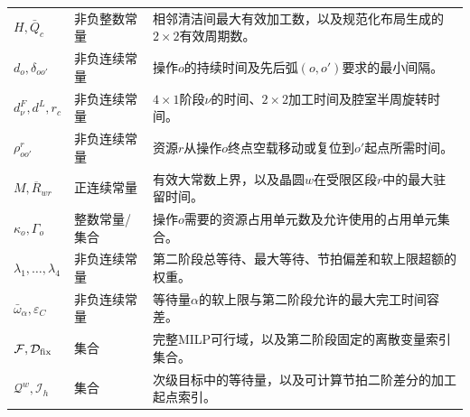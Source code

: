 \documentclass[journal]{IEEEtran}
\begin{document}
\begin{table}[t]
\begin{tabular}{C{0.20\textwidth}C{0.20\textwidth}C{0.55\textwidth}}
$H,\bar Q_c$ & 非负整数常量 & 相邻清洁间最大有效加工数，以及规范化布局生成的$2\times2$有效周期数。\\
$d_o,\delta_{oo'}$ & 非负连续常量 & 操作$o$的持续时间及先后弧$(o,o')$要求的最小间隔。\\
$d^F_\nu,d^L,r_c$ & 非负连续常量 & $4\times1$阶段$\nu$的时间、$2\times2$加工时间及腔室半周旋转时间。\\
$\rho^r_{oo'}$ & 非负连续常量 & 资源$r$从操作$o$终点空载移动或复位到$o'$起点所需时间。\\
$M,\overline R_{wr}$ & 正连续常量 & 有效大常数上界，以及晶圆$w$在受限区段$r$中的最大驻留时间。\\
$\kappa_o,\Gamma_o$ & 整数常量/集合 & 操作$o$需要的资源占用单元数及允许使用的占用单元集合。\\
$\lambda_1,\ldots,\lambda_4$ & 非负连续常量 & 第二阶段总等待、最大等待、节拍偏差和软上限超额的权重。\\
$\bar\omega_\alpha,\varepsilon_C$ & 非负连续常量 & 等待量$\alpha$的软上限与第二阶段允许的最大完工时间容差。\\
$\mathcal F,\mathcal D_{\rm fix}$ & 集合 & 完整MILP可行域，以及第二阶段固定的离散变量索引集合。\\
$\mathcal Q^w,\mathcal I_h$ & 集合 & 次级目标中的等待量，以及可计算节拍二阶差分的加工起点索引。\\
\bottomrule
\end{tabular}
\end{table}
\end{document}
